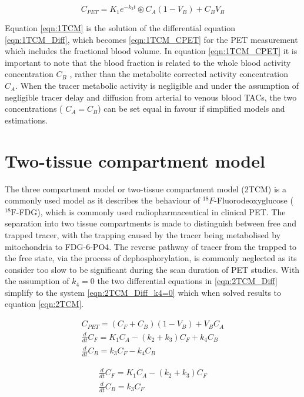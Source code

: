 \begin{equation}
   C_{PET} =   K_1 e^{-k_2 t} \circledast C_A  (1-V_B) + C_B V_B
  \label{eqn:1TCM_CPET}
\end{equation}

Equation \ref{eqn:1TCM} is the solution of the differential equation \ref{eqn:1TCM_Diff}, which becomes \ref{eqn:1TCM_CPET} for the PET measurement which includes the fractional blood volume. In equation \ref{eqn:1TCM_CPET} it is important to note that the blood fraction is related to the whole blood activity concentration $C_B$ , rather than the metabolite corrected activity concentration $C_A$. When the tracer metabolic activity is negligible and under the assumption of negligible tracer delay and diffusion from arterial to venous blood TACs, the two concentrations ( $C_A = C_B$) can be set equal in favour if simplified models and estimations. 

\section{Two-tissue compartment model}
The three compartment model or two-tissue compartment model (2TCM) is a commonly used model as it describes the behaviour of ${}^{18}F$-Fluorodeoxyglucose (${}^{18}\mathrm{F}$-FDG), which is commonly used radiopharmaceutical in clinical PET. The separation into two tissue compartments is made to distinguish between free and trapped tracer, with the trapping caused by the tracer being metabolised by mitochondria to FDG-6-PO4. The reverse pathway of tracer from the trapped to the free state, via the process of dephosphorylation, is commonly neglected as its consider too slow to be significant during the scan duration of PET studies. With the assumption of $k_4=0$ the two differential equations in \ref{eqn:2TCM_Diff} simplify to the system \ref{eqn:2TCM_Diff_k4=0} which when solved results to equation \ref{eqn:2TCM}. 

\begin{subequations}
\begin{align}
C_{PET} = (C_F + C_B)(1-V_B) + V_B C_A \\
\frac{d}{dt}C_F = K_1 C_A - (k_2 + k_3)C_F + k_4 C_B \\ 
\frac{d}{dt}C_B = k_3 C_F - k_4 C_B  
\end{align}
\label{eqn:2TCM_Diff}
\end{subequations}

\begin{subequations}
\begin{align}
\frac{d}{dt}C_F = K_1 C_A - (k_2 + k_3)C_F \\ 
\frac{d}{dt}C_B = k_3 C_F  
\end{align}
\label{eqn:2TCM_Diff_k4=0}
\end{subequations}

